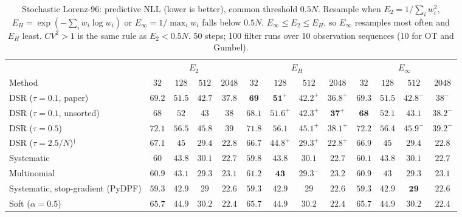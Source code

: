 \begin{table}[ht]
\centering
\small
\caption{Stochastic Lorenz-96: predictive NLL (lower is better), common threshold $0.5N$. Resample when $E_2=1/\sum_iw_i^2$, $E_H=\exp(-\sum_iw_i\log w_i)$ or $E_\infty=1/\max_iw_i$ falls below $0.5N$. $E_\infty\le E_2\le E_H$, so $E_\infty$ resamples most often and $E_H$ least. $CV^2>1$ is the same rule as $E_2<0.5N$. 50 steps; 100 filter runs over 10 observation sequences (10 for OT and Gumbel).}
\label{tab:trigger-fixed-lorenz96-predictive_nll}
\begin{adjustbox}{max width=\linewidth}
\begin{tabular}{lcccc|cccc|cccc}
\toprule
 & \multicolumn{4}{c}{$E_2$} & \multicolumn{4}{c}{$E_H$} & \multicolumn{4}{c}{$E_\infty$} \\
\cmidrule(lr){2-5} \cmidrule(lr){6-9} \cmidrule(lr){10-13}
Method & $32$ & $128$ & $512$ & $2048$ & $32$ & $128$ & $512$ & $2048$ & $32$ & $128$ & $512$ & $2048$ \\
\midrule
DSR ($\tau{=}0.1$, paper) & $69.2$ & $51.5$ & $42.7$ & $37.8$ & $\mathbf{69}$ & $\mathbf{51}^{+}$ & $\mathbf{42.2}^{+}$ & $\mathbf{36.8}^{+}$ & $69.3$ & $51.5$ & $42.8^{-}$ & $38^{-}$ \\
DSR ($\tau{=}0.1$, unsorted) & $68$ & $52$ & $43$ & $38$ & $68.1$ & $\mathbf{51.6}^{+}$ & $\mathbf{42.3}^{+}$ & $\mathbf{37}^{+}$ & $\mathbf{68}$ & $52.1$ & $43.1$ & $38.2^{-}$ \\
DSR ($\tau{=}0.5$) & $72.1$ & $56.5$ & $45.8$ & $39$ & $\mathbf{71.8}$ & $\mathbf{56.1}$ & $\mathbf{45.1}^{+}$ & $\mathbf{38.1}^{+}$ & $72.2$ & $56.4$ & $45.9^{-}$ & $39.2^{-}$ \\
DSR ($\tau{=}2.5/N$)$^\dagger$ & $67.1$ & $45$ & $29.4$ & $22.8$ & $\mathbf{66.7}$ & $\mathbf{44.8}^{+}$ & $\mathbf{29.3}^{+}$ & $\mathbf{22.8}^{+}$ & $66.9$ & $45$ & $29.4$ & $22.8$ \\
\midrule
Systematic & $60$ & $\mathbf{43.8}$ & $30.1$ & $\mathbf{22.7}$ & $\mathbf{59.8}$ & $43.8$ & $\mathbf{30.1}$ & $22.7$ & $60.1$ & $43.8$ & $30.1$ & $22.7$ \\
Multinomial & $\mathbf{60.9}$ & $43.1$ & $\mathbf{29.3}$ & $\mathbf{23.1}$ & $61.2$ & $\mathbf{43}$ & $29.3^{-}$ & $23.2$ & $60.9$ & $43$ & $29.3$ & $\mathbf{23.1}$ \\
Systematic, stop-gradient (PyDPF) & $59.3$ & $\mathbf{42.9}$ & $29$ & $22.6$ & $\mathbf{59.3}$ & $42.9$ & $29$ & $\mathbf{22.6}$ & $59.3$ & $42.9$ & $\mathbf{29}$ & $22.6$ \\
Soft ($\alpha{=}0.5$) & $\mathbf{65.7}$ & $44.9$ & $\mathbf{30.2}$ & $\mathbf{22.4}$ & $65.7$ & $\mathbf{44.9}$ & $30.2$ & $\mathbf{22.4}$ & $\mathbf{65.7}$ & $44.9$ & $\mathbf{30.2}$ & $\mathbf{22.4}$ \\

\end{tabular}
\end{adjustbox}
\end{table}
